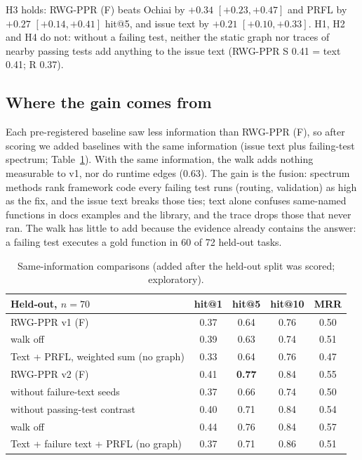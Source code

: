 \documentclass[10pt]{article}
\begin{document}
H3 holds: RWG-PPR (F) beats Ochiai by $+0.34$ $[+0.23, +0.47]$ and PRFL by $+0.27$ $[+0.14, +0.41]$ hit@5, and issue text
by $+0.21$ $[+0.10, +0.33]$. H1, H2 and H4 do not: without a failing test, neither the static graph nor traces of nearby
passing tests add anything to the issue text (RWG-PPR S 0.41 = text 0.41; R 0.37).

\subsection{Where the gain comes from}

Each pre-registered baseline saw less information than RWG-PPR (F), so after scoring we added baselines with the same
information (issue text plus failing-test spectrum; Table~\ref{tab:same}). With the same information, the walk adds
nothing measurable to v1, nor do runtime edges (0.63). The gain is the fusion: spectrum methods rank framework code
every failing test runs (routing, validation) as high as the fix, and the issue text breaks those ties; text alone
confuses same-named functions in docs examples and the library, and the trace drops those that never ran. The walk has
little to add because the evidence already contains the answer: a failing test executes a gold function in 60 of 72
held-out tasks.

\begin{table}[h]
\centering\small
\begin{tabular}{lcccc}
\toprule
Held-out, $n=70$ & hit@1 & hit@5 & hit@10 & MRR \\
\midrule
RWG-PPR v1 (F) & 0.37 & 0.64 & 0.76 & 0.50 \\
\quad walk off & 0.39 & 0.63 & 0.74 & 0.51 \\
Text + PRFL, weighted sum (no graph) & 0.33 & 0.64 & 0.76 & 0.47 \\
\midrule
RWG-PPR v2 (F) & 0.41 & \textbf{0.77} & 0.84 & 0.55 \\
\quad without failure-text seeds & 0.37 & 0.66 & 0.74 & 0.50 \\
\quad without passing-test contrast & 0.40 & 0.71 & 0.84 & 0.54 \\
\quad walk off & 0.44 & 0.76 & 0.84 & 0.57 \\
Text + failure text + PRFL (no graph) & 0.37 & 0.71 & 0.86 & 0.51 \\
\bottomrule
\end{tabular}
\caption{Same-information comparisons (added after the held-out split was scored; exploratory).}
\label{tab:same}
\end{table}
\end{document}
